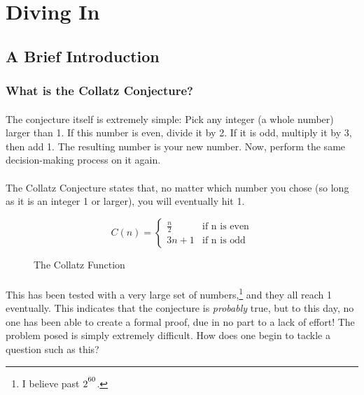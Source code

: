 \documentclass[12pt,letterpaper]{article}
\begin{document}
		
		\newpage
		
	
	\section{Diving In}
	
		\subsection{A Brief Introduction}
		
			\subsubsection{What is the Collatz Conjecture?}
			
				\paragraph{} The conjecture itself is extremely simple: Pick any integer (a whole number) larger than 1. If this number is even, divide it by 2. If it is odd, multiply it by 3, then add 1. The resulting number is your new number. Now, perform the same decision-making process on it again. 
				
				\paragraph{} The Collatz Conjecture states that, no matter which number you chose (so long as it is an integer 1 or larger), you will eventually hit 1.
				
				\begin{figure}[h] 
					\begin{displaymath} 
					C(n) = 
					\begin{cases}
					\frac{n}{2} &\text{if n is even}\\
					3n+1 &\text{if n is odd}
					\end{cases}
					\end{displaymath}
					
					\caption{The Collatz Function}
					\label{function:collatz}
				\end{figure}
				
				
				\paragraph{} This has been tested with a very large set of numbers,\footnote{I believe past $2\strut^{60}$.} and they all reach 1 eventually. This indicates that the conjecture is \textit{probably} true, but to this day, no one has been able to create a formal proof, due in no part to a lack of effort! The problem posed is simply extremely difficult. How does one begin to tackle a question such as this?
				
\end{document}
